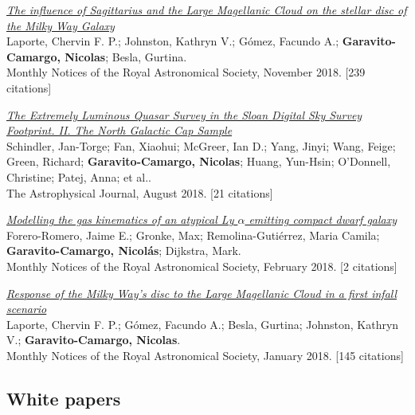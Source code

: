 \documentclass[14pt]{article}
\begin{document}
\begin{etaremune}
\item \textit{\href{https://ui.adsabs.harvard.edu/abs/2018MNRAS.481..286L/abstract}{The influence of Sagittarius and the Large Magellanic Cloud on the stellar disc of the Milky Way Galaxy}}\\
  {\small \color{darkgray} Laporte, Chervin F. P.; Johnston, Kathryn V.; Gómez, Facundo A.; \textbf{Garavito-Camargo, Nicolas}; Besla, Gurtina.\\
  Monthly Notices of the Royal Astronomical Society, November 2018. [239 citations]}

\item \textit{\href{https://ui.adsabs.harvard.edu/abs/2018ApJ...863..144S/abstract}{The Extremely Luminous Quasar Survey in the Sloan Digital Sky Survey Footprint. II. The North Galactic Cap Sample}}\\
  {\small \color{darkgray} Schindler, Jan-Torge; Fan, Xiaohui; McGreer, Ian D.; Yang, Jinyi; Wang, Feige; Green, Richard; \textbf{Garavito-Camargo, Nicolas}; Huang, Yun-Hsin; O'Donnell, Christine; Patej, Anna; et al..\\
  The Astrophysical Journal, August 2018. [21 citations]}

\item \textit{\href{https://ui.adsabs.harvard.edu/abs/2018MNRAS.474...12F/abstract}{Modelling the gas kinematics of an atypical Ly $\alpha$ emitting compact dwarf galaxy}}\\
  {\small \color{darkgray} Forero-Romero, Jaime E.; Gronke, Max; Remolina-Gutiérrez, Maria Camila; \textbf{Garavito-Camargo, Nicolás}; Dijkstra, Mark.\\
  Monthly Notices of the Royal Astronomical Society, February 2018. [2 citations]}

\item \textit{\href{https://ui.adsabs.harvard.edu/abs/2018MNRAS.473.1218L/abstract}{Response of the Milky Way's disc to the Large Magellanic Cloud in a first infall scenario}}\\
  {\small \color{darkgray} Laporte, Chervin F. P.; Gómez, Facundo A.; Besla, Gurtina; Johnston, Kathryn V.; \textbf{Garavito-Camargo, Nicolas}.\\
  Monthly Notices of the Royal Astronomical Society, January 2018. [145 citations]}

\end{etaremune}

\subsection*{White papers}
\end{document}
